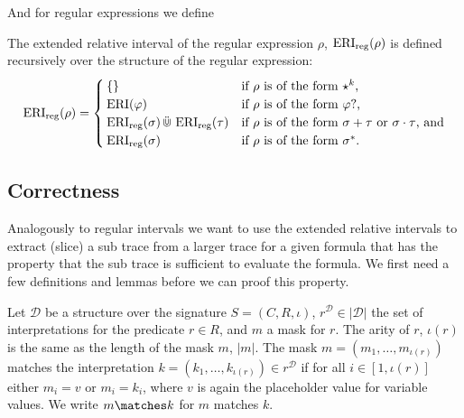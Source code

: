 And for regular expressions we define 
\begin{definition}
    \label{def:e-rel-int-reg}
    The extended relative interval of the regular expression $\rho$, $\operatorname{ERI}_{\text{reg}}(\rho)$ is defined recursively over the structure of the regular expression:
    \begin{equation*}
        \operatorname{ERI}_{\text{reg}}(\rho) =
        \begin{cases}
            \{\} & \text{if $\rho$ is of the form $\star^k$,} \\
            \operatorname{ERI}(\varphi) & \text{if $\rho$ is of the form $\varphi ?$,} \\
            \operatorname{ERI}_{\text{reg}}(\sigma) \,\ddot{\Cup}\, \operatorname{ERI}_{\text{reg}}(\tau) & \text{if $\rho$ is of the form $\sigma + \tau$ or $\sigma \cdot \tau$, and} \\
            \operatorname{ERI}_{\text{reg}}(\sigma) & \text{if $\rho$ is of the form $\sigma^*$.}
        \end{cases}
    \end{equation*}
\end{definition}


\subsection{Correctness}
Analogously to regular intervals we want to use the extended relative intervals to extract (slice) a sub trace from a larger trace for a given formula that has the property that the sub trace is sufficient to evaluate the formula.
We first need a few definitions and lemmas before we can proof this property.
\begin{definition}
    \label{def:matching-predicate}
    Let $\mathcal{D}$ be a structure over the signature $S = (C,R,\iota)$, $r^{\mathcal{D}} \in |\mathcal{D}|$ the set of interpretations for the predicate $r \in R$, and $m$ a mask for $r$.
    The arity of $r$, $\iota(r)$ is the same as the length of the mask $m$, $|m|$.
    The mask $m = (m_1, \dots, m_{\iota(r)})$ matches the interpretation $k = (k_1, \dots, k_{\iota(r)}) \in r^{\mathcal{D}}$ if for all $i \in [1,\iota(r)]$ either $m_i = v$ or $m_i = k_i$, where $v$ is again the placeholder value for variable values.
    We write $m \matches k$ for $m$ matches $k$.
\end{definition}



